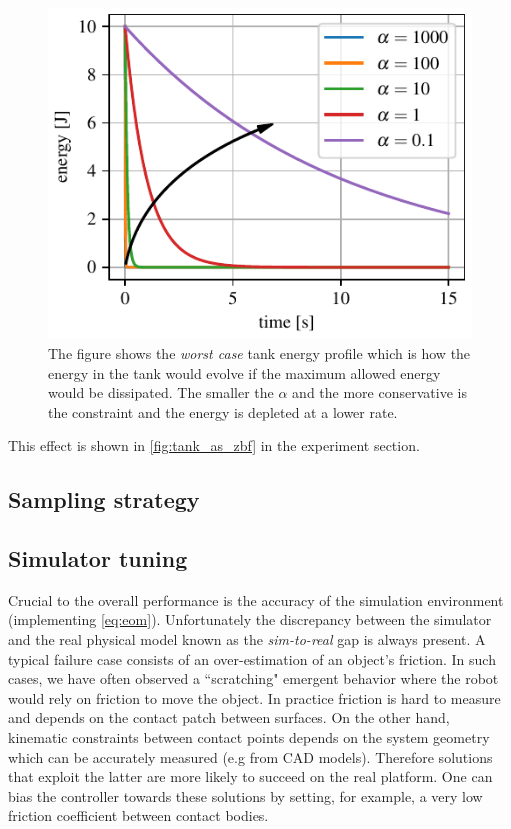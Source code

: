 \begin{figure}[t]
    \centering
    \includegraphics[width=0.9\columnwidth]{figures/worst_case_energy_profile.pdf}
    \caption{The figure shows the \textit{worst case} tank energy profile which is how the energy in the tank would evolve if the maximum allowed energy would be dissipated. The smaller the $\alpha$ and the more conservative is the constraint and the energy is depleted at a lower rate.}
    \label{fig:worst_case_energy_profile}
\end{figure}

This effect is shown in \fig \ref{fig:tank_as_zbf} in the experiment section.

\subsection{Sampling strategy}

\subsection{Simulator tuning}
Crucial to the overall performance is the accuracy of the simulation environment (implementing \eqref{eq:eom}). Unfortunately the discrepancy between the simulator and the real physical model known as the \emph{sim-to-real} gap is always present. A typical failure case consists of an over-estimation of an object's friction. In such cases, we have often observed a ``scratching" emergent behavior where the robot would rely on friction to move the object. In practice friction is hard to measure and depends on the contact patch between surfaces. On the other hand, kinematic constraints between contact points depends on the system geometry which can be accurately measured (e.g from CAD models). Therefore solutions that exploit the latter are more likely to succeed on the real platform. One can bias the controller towards these solutions by setting, for example, a very low friction coefficient between contact bodies.

